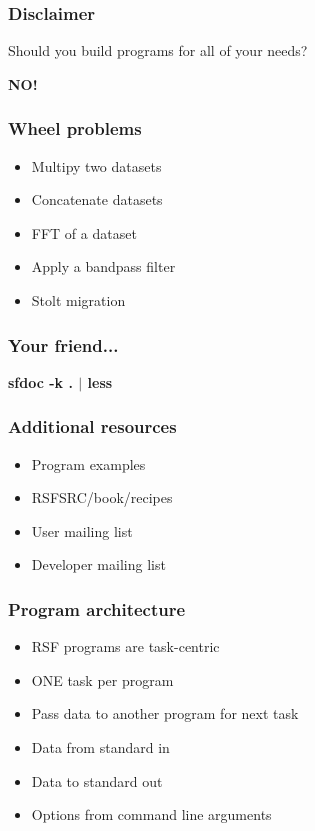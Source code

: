 \begin{frame} \frametitle{Disclaimer}
Should you build programs for all of your needs?
\linebreak
\pause
\begin{center}\Huge\textbf{NO!}\end{center}
\end{frame}

\begin{frame}
\end{frame}

\begin{frame} \frametitle{Wheel problems}
\begin{itemize}
\item Multipy two datasets
\pause
\item Concatenate datasets
\pause
\item FFT of a dataset
\pause
\item Apply a bandpass filter
\pause
\item Stolt migration
\end{itemize}
\end{frame}

\begin{frame} \frametitle{Your friend...}
\begin{center}\Huge\textbf{sfdoc -k . $|$ less}\end{center}
\end{frame}

\begin{frame} \frametitle{Additional resources}
\begin{itemize}
\item Program examples
\item RSFSRC/book/recipes
\item User mailing list
\item Developer mailing list
\end{itemize}
\end{frame}




\begin{frame}
\end{frame}

\begin{frame} \frametitle{Program architecture}
\begin{itemize}
\item RSF programs are task-centric
\pause
\item ONE task per program
\pause
\item Pass data to another program for next task
\pause
\item Data from standard in 
\item Data to   standard out
\item Options from command line arguments
\end{itemize}
\end{frame}

